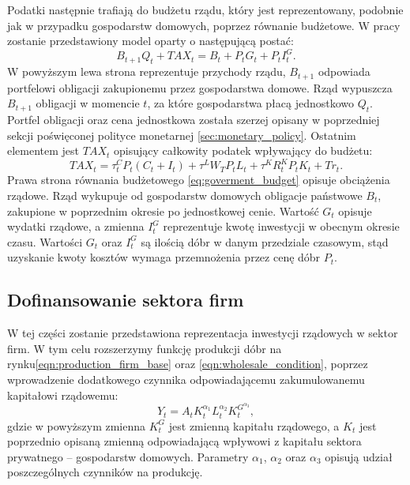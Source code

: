 Podatki następnie trafiają do budżetu rządu, który jest reprezentowany, podobnie jak w przypadku gospodarstw domowych, poprzez równanie budżetowe. W pracy zostanie przedstawiony model oparty o następującą postać:
\begin{equation}
    \label{eq:goverment_budget}
    B_{t+1}Q_t + TAX_t = B_{t} +  P_t G_t + P_t I^G_t.
\end{equation}
W powyższym lewa strona reprezentuje przychody rządu, $B_{t+1}$ odpowiada portfelowi obligacji zakupionemu przez gospodarstwa domowe. Rząd wypuszcza $B_{t+1}$ obligacji w momencie $t$, za które gospodarstwa płacą jednostkowo $Q_t$. Portfel obligacji oraz cena jednostkowa została szerzej opisany w poprzedniej sekcji poświęconej polityce monetarnej \ref{sec:monetary_policy}. Ostatnim elementem jest $TAX_t$ opisujący całkowity podatek wpływający do budżetu:
\begin{equation}
    TAX_t = \tau_t^C P_t (C_t + I_t) + \tau^L W_T P_t L_t + \tau^K R^K_t P_t K_t + Tr_t.
\end{equation}
Prawa strona równania budżetowego \eqref{eq:goverment_budget} opisuje obciążenia rządowe. Rząd wykupuje od gospodarstw domowych obligacje państwowe $B_{t}$, zakupione w poprzednim okresie po jednostkowej cenie. Wartość $G_t$ opisuje wydatki rządowe, a zmienna $I^G_t$ reprezentuje kwotę inwestycji w obecnym okresie czasu. Wartości $G_t$ oraz $I^G_t$ są ilością dóbr w danym przedziale czasowym, stąd uzyskanie kwoty kosztów wymaga przemnożenia przez cenę dóbr $P_t$.

\subsection{Dofinansowanie sektora firm}

W tej części zostanie przedstawiona reprezentacja inwestycji rządowych w sektor firm. W tym celu rozszerzymy funkcję produkcji dóbr na rynku\eqref{eqn:production_firm_base} oraz \eqref{eqn:wholesale_condition}, poprzez wprowadzenie dodatkowego czynnika odpowiadającemu zakumulowanemu kapitałowi rządowemu:
\begin{equation}
    Y_t = A_t K_t^{{\alpha_1}}L_t^{\alpha_2}K_t^{G^{\alpha_3}},
\end{equation}
gdzie w powyższym zmienna $K_t^{G}$ jest zmienną kapitału rządowego, a $K_t$ jest poprzednio opisaną zmienną odpowiadającą wpływowi z kapitału sektora prywatnego -- gospodarstw domowych. Parametry $\alpha_1$, $\alpha_2$ oraz $\alpha_3$ opisują udział poszczególnych czynników na produkcję. 

